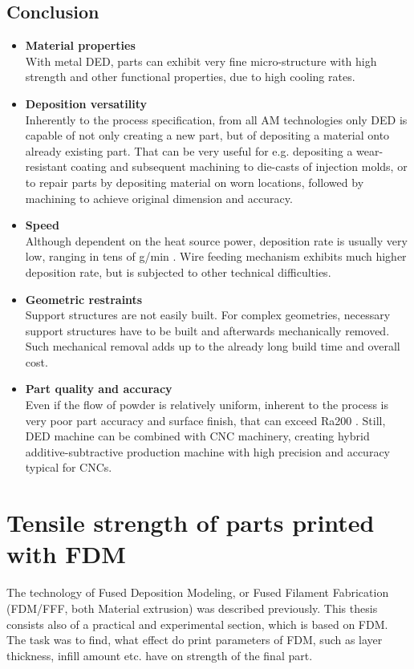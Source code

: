 \documentclass[a4paper, 11pt, reqno]{report}
\newcommand\pro{\item[$+$]}
\newcommand\con{\item[$-$]}
\begin{document}
\section{Conclusion}
\begin{itemize}
\pro \textbf{Material properties}\\
With metal DED, parts can exhibit very fine micro-structure with high strength and other functional properties, due to high cooling rates.

\pro \textbf{Deposition versatility}\\
Inherently to the process specification, from all AM technologies only DED is capable of not only creating a new part, but of depositing a material onto already existing part. That can be very useful for e.g. depositing a wear-resistant coating and subsequent machining to die-casts of injection molds, or to repair parts by depositing material on worn locations, followed by machining to achieve original dimension and accuracy.

\con \textbf{Speed}\\
Although dependent on the heat source power, deposition rate is usually very low, ranging in tens of g/min \cite{WireFeed}. Wire feeding mechanism exhibits much higher deposition rate, but is subjected to other technical difficulties.

\con \textbf{Geometric restraints}\\
Support structures are not easily built. For complex geometries, necessary support structures have to be built and afterwards mechanically removed. Such mechanical removal adds up to the already long build time and overall cost.

\con \textbf{Part quality and accuracy}\\
Even if the flow of powder is relatively uniform, inherent to the process is very poor part accuracy and surface finish, that can exceed Ra200 \cite{WireFeed}. Still, DED machine can be combined with CNC machinery, creating hybrid additive-subtractive production machine with high precision and accuracy typical for CNCs.
\end{itemize}


\chapter{Tensile strength of parts printed with FDM}
The technology of Fused Deposition Modeling, or Fused Filament Fabrication (FDM/FFF, both Material extrusion) was described previously. This thesis consists also of a practical and experimental section, which is based on FDM. The task was to find, what effect do print parameters of FDM, such as layer thickness, infill amount etc. have on strength of the final part.\\
\end{document}
